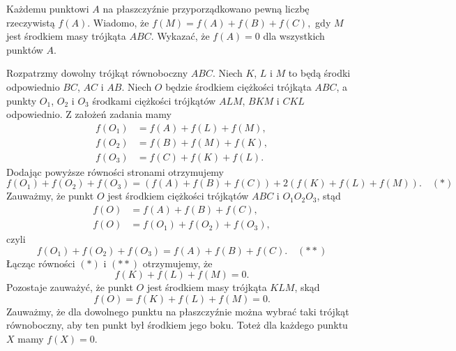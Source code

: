 \newpage
{}

\begin{problem}{1}
	Każdemu punktowi $A$ na płaszczyźnie przyporządkowano pewną liczbę rzeczywistą $f(A).$ Wiadomo, że $f(M) = f(A) + f(B) + f(C),$ gdy $M$ jest środkiem masy trójkąta $ABC.$ Wykazać, że $f(A) = 0$ dla wszystkich punktów $A.$
\end{problem}

\begin{center}
\end{center}

\noindent
Rozpatrzmy dowolny trójkąt równoboczny $ABC$. Niech $K$, $L$ i $M$ to będą środki odpowiednio $BC$, $AC$ i $AB$. Niech $O$ będzie środkiem ciężkości trójkąta $ABC$, a punkty $O_1$, $O_2$ i $O_3$ środkami ciężkości trójkątów $ALM$, $BKM$ i $CKL$ odpowiednio. Z założeń zadania mamy
\begin{align*}
	f(O_1) &= f(A) + f(L) + f(M), \\
	f(O_2) &= f(B) + f(M) + f(K), \\
	f(O_3) &= f(C) + f(K) + f(L).
\end{align*}
Dodając powyższe równości stronami otrzymujemy
\[
	f(O_1) + f(O_2) + f(O_3) = (f(A) + f(B) + f(C)) + 2(f(K) + f(L) + f(M)). \quad (*)
\]
Zauważmy, że punkt $O$ jest środkiem ciężkości trójkątów $ABC$ i $O_1O_2O_3$, stąd
\begin{align*}
	f(O) &= f(A) + f(B) + f(C), \\
	f(O) &= f(O_1) + f(O_2) + f(O_3),
\end{align*}
czyli
\[
	f(O_1) + f(O_2) + f(O_3) = f(A) + f(B) + f(C). \quad (**)
\]
Łącząc równości $(*)$ i $(**)$ otrzymujemy, że
\[
	f(K) + f(L) + f(M) = 0.
\]
Pozostaje zauważyć, że punkt $O$ jest środkiem masy trójkąta $KLM$, skąd
\[
	f(O) = f(K) + f(L) + f(M) = 0.
\]
Zauważmy, że dla dowolnego punktu na płaszczyźnie można wybrać taki trójkąt równoboczny, aby ten punkt był środkiem jego boku. Toteż dla każdego punktu $X$ mamy $f(X) = 0$.


